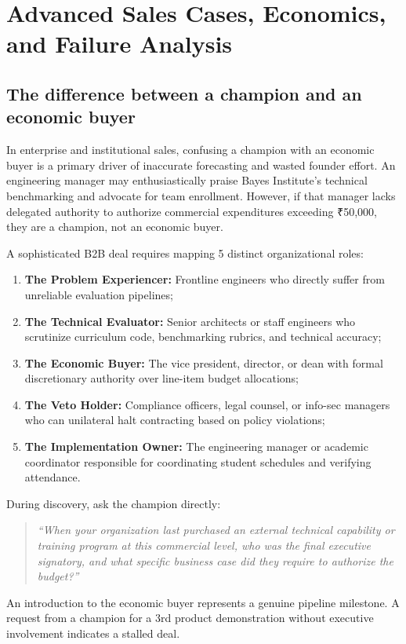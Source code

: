 \section{Advanced Sales Cases, Economics, and Failure Analysis}

\subsection{The difference between a champion and an economic buyer}

In enterprise and institutional sales, confusing a champion with an economic buyer is a primary driver of inaccurate forecasting and wasted founder effort. An engineering manager may enthusiastically praise Bayes Institute's technical benchmarking and advocate for team enrollment. However, if that manager lacks delegated authority to authorize commercial expenditures exceeding ₹50,000, they are a champion, not an economic buyer.

A sophisticated B2B deal requires mapping 5 distinct organizational roles:
\begin{enumerate}
\item \textbf{The Problem Experiencer:} Frontline engineers who directly suffer from unreliable evaluation pipelines;
\item \textbf{The Technical Evaluator:} Senior architects or staff engineers who scrutinize curriculum code, benchmarking rubrics, and technical accuracy;
\item \textbf{The Economic Buyer:} The vice president, director, or dean with formal discretionary authority over line-item budget allocations;
\item \textbf{The Veto Holder:} Compliance officers, legal counsel, or info-sec managers who can unilateral halt contracting based on policy violations;
\item \textbf{The Implementation Owner:} The engineering manager or academic coordinator responsible for coordinating student schedules and verifying attendance.
\end{enumerate}
During discovery, ask the champion directly:
\begin{quote}
\textit{``When your organization last purchased an external technical capability or training program at this commercial level, who was the final executive signatory, and what specific business case did they require to authorize the budget?''}
\end{quote}
An introduction to the economic buyer represents a genuine pipeline milestone. A request from a champion for a 3rd product demonstration without executive involvement indicates a stalled deal.

